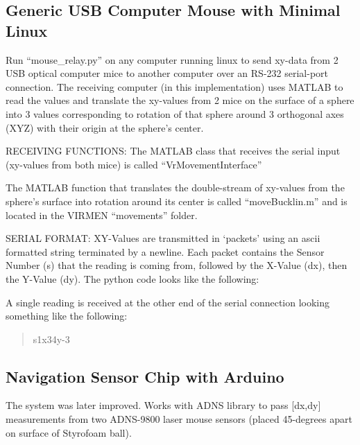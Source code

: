 \documentclass[../main.tex]{subfiles}
\begin{document}
\subsection{Generic USB Computer Mouse with Minimal Linux}\label{sec:generic-usb-computer-mouse-with-minimal-linux}

Run ``mouse\_relay.py'' on any computer running linux to send xy-data from 2 USB optical computer mice to another computer over an RS-232 serial-port connection.
The receiving computer (in this implementation) uses MATLAB to read the values and translate the xy-values from 2 mice on the surface of a sphere into 3 values corresponding to rotation of that sphere around 3 orthogonal axes (XYZ) with their origin at the sphere's center.

RECEIVING FUNCTIONS: The MATLAB class that receives the serial input (xy-values from both mice) is called ``VrMovementInterface''

The MATLAB function that translates the double-stream of xy-values from the sphere's surface into rotation around its center is called ``moveBucklin.m'' and is located in the VIRMEN ``movements'' folder.

SERIAL FORMAT: XY-Values are transmitted in `packets' using an ascii formatted string terminated by a newline.
Each packet contains the Sensor Number (s) that the reading is coming from, followed by the X-Value (dx), then the Y-Value (dy).
The python code looks like the following:

A single reading is received at the other end of the serial connection looking something like the following:

\begin{quote}
	s1x34y-3
\end{quote}

\subsection{Navigation Sensor Chip with Arduino}\label{sec:navigation-sensor-chip-with-arduino}

The system was later improved.
Works with ADNS library to pass {[}dx,dy{]} measurements from two ADNS-9800 laser mouse sensors (placed 45-degrees apart on surface of Styrofoam ball).
\end{document}
